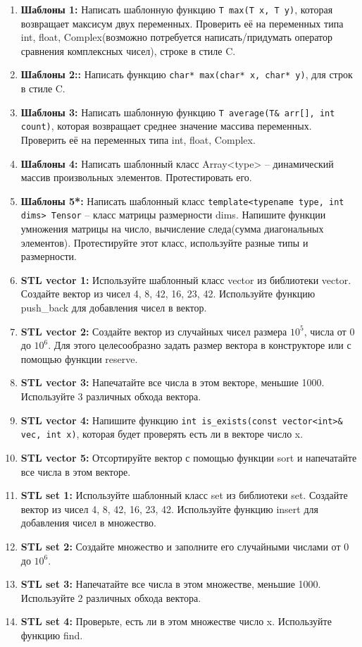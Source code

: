 \documentclass{article}
\begin{document}
\begin{enumerate}
\item \textbf{Шаблоны 1:} Написать шаблонную функцию \texttt{T max(T x, T y)}, которая возвращает максисум двух переменных. Проверить её на переменных типа int, float, Complex(возможно потребуется написать/придумать оператор сравнения комплексных чисел), строке в стиле C.
\item \textbf{Шаблоны 2::} Написать функцию \texttt{char* max(char* x, char* y)}, для строк в стиле C.
\item \textbf{Шаблоны 3:} Написать шаблонную функцию \texttt{T average(T\& arr[], int count)}, которая возвращает среднее значение массива переменных. Проверить её на переменных типа int, float, Complex.
\item \textbf{Шаблоны 4:} Написать шаблонный класс Array<type> -- динамический массив произвольных элементов. Протестировать его.
\item \textbf{Шаблоны 5*:} Написать шаблонный класс \texttt{template<typename type, int dims> Tensor} -- класс матрицы размерности dims. Напишите функции умножения матрицы на число, вычисление следа(сумма диагональных элементов). Протестируйте этот класс, используйте разные типы и размерности.
\item \textbf{STL vector 1:} Используйте шаблонный класс vector из библиотеки vector. Создайте вектор из чисел 4, 8, 42, 16, 23, 42. Используйте функцию push\_back для добавления чисел в вектор.
\item \textbf{STL vector 2:} Создайте вектор из случайных чисел размера $10^5$, числа от 0 до $10^6$. Для этого целесообразно задать размер вектора в конструкторе или с помощью функции reserve.
\item \textbf{STL vector 3:} Напечатайте все числа в этом векторе, меньшие 1000. Используйте 3 различных обхода вектора.
\item \textbf{STL vector 4:} Напишите функцию \texttt{int is\_exists(const vector<int>\& vec, int x)}, которая будет проверять есть ли в векторе число x.
\item \textbf{STL vector 5:} Отсортируйте вектор с помощью функции sort и напечатайте все числа в этом векторе.
\item \textbf{STL set 1:} Используйте шаблонный класс set из библиотеки set. Создайте вектор из чисел 4, 8, 42, 16, 23, 42. Используйте функцию insert для добавления чисел в множество.
\item \textbf{STL set 2:} Создайте множество и заполните его случайными числами от 0 до $10^6$. 
\item \textbf{STL set 3:} Напечатайте все числа в этом множестве, меньшие 1000. Используйте 2 различных обхода вектора.
\item \textbf{STL set 4:} Проверьте, есть ли в этом множестве число x. Используйте функцию find.
\end{enumerate}
\end{document}
